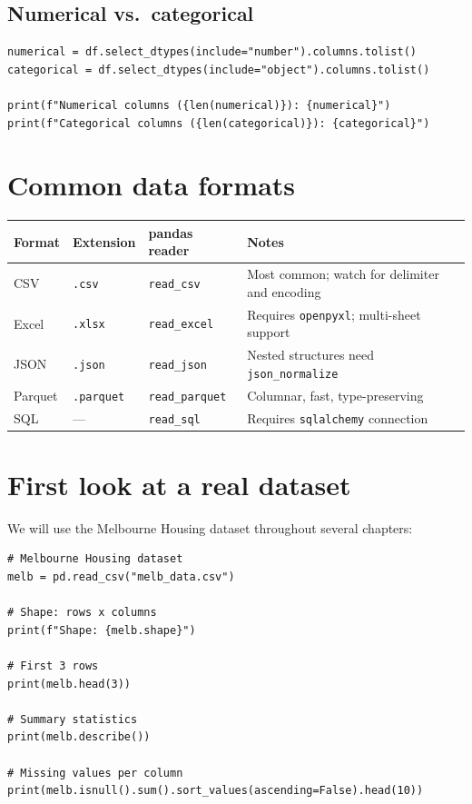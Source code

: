 \subsection{Numerical vs.\ categorical}

\begin{verbatim}
numerical = df.select_dtypes(include="number").columns.tolist()
categorical = df.select_dtypes(include="object").columns.tolist()

print(f"Numerical columns ({len(numerical)}): {numerical}")
print(f"Categorical columns ({len(categorical)}): {categorical}")
\end{verbatim}

\section{Common data formats}

\begin{longtable}{lllp{5cm}}
\toprule
\textbf{Format} & \textbf{Extension} & \textbf{pandas reader} & \textbf{Notes} \\
\midrule
CSV & \texttt{.csv} & \texttt{read\_csv} & Most common; watch for delimiter and encoding \\
Excel & \texttt{.xlsx} & \texttt{read\_excel} & Requires \texttt{openpyxl}; multi-sheet support \\
JSON & \texttt{.json} & \texttt{read\_json} & Nested structures need \texttt{json\_normalize} \\
Parquet & \texttt{.parquet} & \texttt{read\_parquet} & Columnar, fast, type-preserving \\
SQL & --- & \texttt{read\_sql} & Requires \texttt{sqlalchemy} connection \\
\bottomrule
\end{longtable}

\section{First look at a real dataset}

We will use the Melbourne Housing dataset throughout several chapters:

\begin{verbatim}
# Melbourne Housing dataset
melb = pd.read_csv("melb_data.csv")

# Shape: rows x columns
print(f"Shape: {melb.shape}")

# First 3 rows
print(melb.head(3))

# Summary statistics
print(melb.describe())

# Missing values per column
print(melb.isnull().sum().sort_values(ascending=False).head(10))
\end{verbatim}

